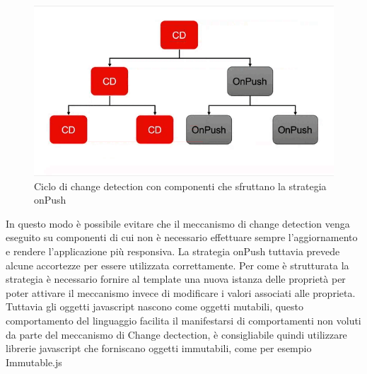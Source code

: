 \begin{figure}[H]
    \centering
 \includegraphics[scale=0.75]{resources/cd-onPush.png}
   \caption{Ciclo di change detection con componenti che sfruttano la strategia onPush}
\end{figure}
In questo modo è possibile evitare che il meccanismo di change detection venga eseguito su componenti di cui non è necessario effettuare sempre l'aggiornamento e rendere l'applicazione più responsiva.
\newline
La strategia onPush tuttavia prevede alcune accortezze per essere utilizzata correttamente. Per come è strutturata la strategia è necessario fornire al template una nuova istanza delle proprietà per poter attivare il meccanismo invece di modificare i valori associati alle proprieta.
\newline
Tuttavia gli oggetti javascript nascono come oggetti mutabili, questo comportamento del linguaggio facilita il manifestarsi di comportamenti non voluti da parte del meccanismo di Change dectection, è consigliabile quindi utilizzare librerie javascript che forniscano oggetti immutabili, come per esempio Immutable.js